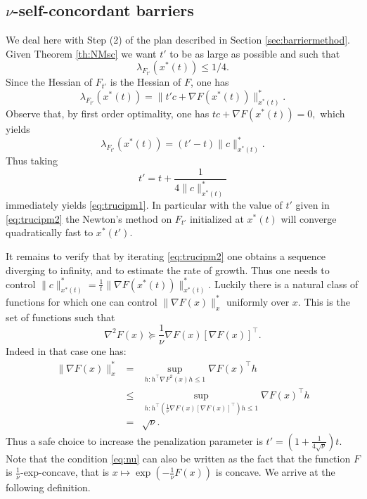 \documentclass[openany]{now}
\begin{document}
\subsection{$\nu$-self-concordant barriers}
We deal here with Step (2) of the plan described in Section \ref{sec:barriermethod}. Given Theorem \ref{th:NMsc} we want $t'$ to be as large as possible and such that
\begin{equation} \label{eq:trucipm1}
\lambda_{F_{t'}}(x^*(t) ) \leq 1/4 .
\end{equation}
Since the Hessian of $F_{t'}$ is the Hessian of $F$, one has
$$\lambda_{F_{t'}}(x^*(t) ) = \|t' c + \nabla F(x^*(t)) \|_{x^*(t)}^* .$$
Observe that, by first order optimality, one has 
$t c + \nabla F(x^*(t))  = 0,$
which yields
\begin{equation} \label{eq:trucipm11}
\lambda_{F_{t'}}(x^*(t) ) = (t'-t) \|c\|^*_{x^*(t)} .
\end{equation}
Thus taking 
\begin{equation} \label{eq:trucipm2}
t' = t + \frac{1}{4 \|c\|^*_{x^*(t)}}
\end{equation} 
immediately yields \eqref{eq:trucipm1}. In particular with the value of $t'$ given in \eqref{eq:trucipm2} the Newton's method on $F_{t'}$ initialized at $x^*(t)$ will converge quadratically fast to $x^*(t')$.

It remains to verify that by iterating \eqref{eq:trucipm2} one obtains a sequence diverging to infinity, and to estimate the rate of growth. Thus one needs to control $\|c\|^*_{x^*(t)} = \frac1{t} \|\nabla F(x^*(t))\|_{x^*(t)}^*$. Luckily there is a natural class of functions for which one can control $\|\nabla F(x)\|_x^*$ uniformly over $x$. This is the set of functions such that
\begin{equation} \label{eq:nu}
\nabla^2 F(x) \succeq \frac1{\nu} \nabla F(x) [\nabla F(x) ]^{\top} .
\end{equation}
Indeed in that case one has:
\begin{eqnarray*}
\|\nabla F(x)\|_x^* & = & \sup_{h : h^{\top} \nabla F^2(x) h \leq 1} \nabla F(x)^{\top} h \\
& \leq & \sup_{h : h^{\top} \left( \frac1{\nu} \nabla F(x) [\nabla F(x) ]^{\top} \right) h \leq 1} \nabla F(x)^{\top} h \\
& = & \sqrt{\nu} .
\end{eqnarray*}
Thus a safe choice to increase the penalization parameter is $t' = \left(1 + \frac1{4\sqrt{\nu}}\right) t$. Note that the condition \eqref{eq:nu} can also be written as the fact that the function $F$ is $\frac1{\nu}$-exp-concave, that is $x \mapsto \exp(- \frac1{\nu} F(x))$ is concave. We arrive at the following definition.
\end{document}
